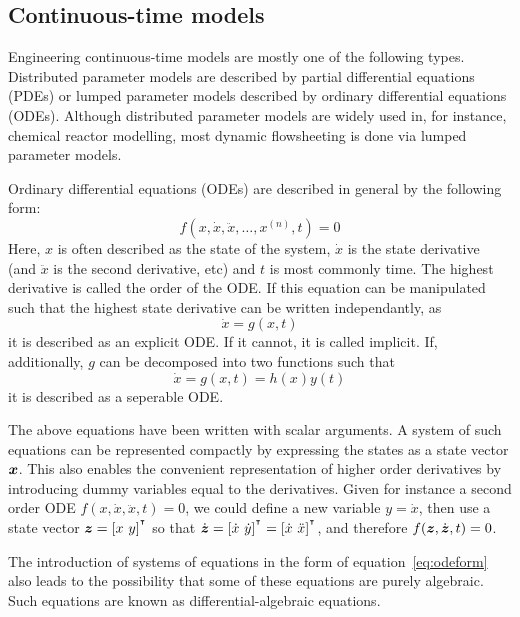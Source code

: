 \subsection{Continuous-time models}
Engineering continuous-time models are mostly one of the following types.
Distributed parameter models are described by partial differential equations (PDEs) or lumped parameter models described by ordinary differential equations (ODEs).
Although distributed parameter models are widely used in, for instance, chemical reactor modelling, most dynamic flowsheeting is done via lumped parameter models.

Ordinary differential equations (ODEs) are described in general by the following form:
\begin{equation}
  \label{eq:odeform}
  f(x, \dot{x}, \ddot{x}, \ldots, x^{(n)}, t) = 0
\end{equation}
Here, $x$ is often described as the state of the system, $\dot{x}$ is the state derivative (and $\ddot{x}$ is the second derivative, etc) and $t$ is most commonly time.
The highest derivative is called the order of the ODE.
If this equation can be manipulated such that the highest state derivative can be written independantly, as
\begin{equation}
  \label{eq:odeform_explicit}
  \dot{x} = g(x, t)
\end{equation}
it is described as an explicit ODE.  
If it cannot, it is called implicit.  
If, additionally, $g$ can be decomposed into two functions such that 
\begin{equation}
  \label{eq:odeform_seperable}
  \dot{x} = g(x, t) = h(x)y(t)
\end{equation}
it is described as a seperable ODE.

The above equations have been written with scalar arguments.  A system of such equations can be represented compactly by expressing the states as a state vector $\boldsymbol{x}$.  
This also enables the convenient representation of higher order derivatives by introducing dummy variables equal to the derivatives.  
Given for instance a second order ODE $f(x, \dot{x}, \ddot{x}, t)=0$, we could define a new variable $y=\dot{x}$, then use a state vector $\boldsymbol{z}=[x~y]^{{^\intercal}}$ so that $\dot{\boldsymbol{z}} = [\dot{x}~\dot{y}]^{{^\intercal}} = [\dot{x}~\ddot{x}]^{{^\intercal}}$, and therefore $f(\boldsymbol{z}, \dot{\boldsymbol{z}}, t) = 0$.  

The introduction of systems of equations in the form of equation~\ref{eq:odeform} also leads to the possibility that some of these equations are purely algebraic.
Such equations are known as differential-algebraic equations.

